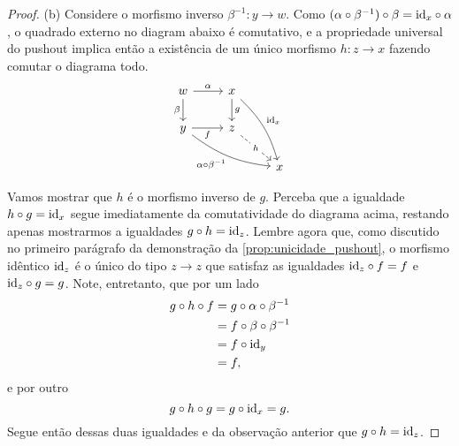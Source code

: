 \begin{proof}
    \smallskip
    (b) Considere o morfismo inverso $\beta^{-1}: y \to w$.
    Como $(\alpha \circ \beta^{-1}) \circ \beta = \mathrm{id}_x \circ \alpha$, o quadrado externo no diagram abaixo é comutativo, e a propriedade universal do pushout implica então a existência de um único morfismo $h: z \to x$ fazendo comutar o diagrama todo.
    \begin{displaymath}
        \begin{tikzcd}
            w
            \arrow[r, "\alpha"]
            \arrow[d, "\beta" swap]
            & x
            \arrow[d, "g"]
            \arrow[rdd, bend left=15, "\id_x"]
            \\ y
            \arrow[r, "f" swap]
            \arrow[rrd, bend right=15, "\alpha \circ \beta^{-1}" swap]
            & z
            \arrow[rd, dashed, "h" description]
            \\ & & x
        \end{tikzcd}
    \end{displaymath}

    Vamos mostrar que $h$ é o morfismo inverso de $g$.
    Perceba que a igualdade $h \circ g = \mathrm{id}_x$ segue imediatamente da comutatividade do diagrama acima, restando apenas mostrarmos a igualdades $g \circ h = \mathrm{id}_z$.
    Lembre agora que, como discutido no primeiro parágrafo da demonstração da \cref{prop:unicidade_pushout}, o morfismo idêntico $\mathrm{id}_z$ é o único do tipo $z \to z$ que satisfaz as igualdades $\mathrm{id}_z \circ f = f$ e $\mathrm{id}_z \circ g = g$.
    Note, entretanto, que por um lado
    \begin{align*}
        g \circ h \circ f
        & = g \circ \alpha \circ \beta^{-1} \\
        & = f \circ \beta \circ \beta^{-1} \\
        & = f \circ \mathrm{id}_y \\
        & = f,
    \end{align*}
    e por outro
    \begin{displaymath}
        g \circ h \circ g
        = g \circ \mathrm{id}_x
        = g.
    \end{displaymath}
    Segue então dessas duas igualdades e da observação anterior que $g \circ h = \mathrm{id}_z$.
\end{proof}

